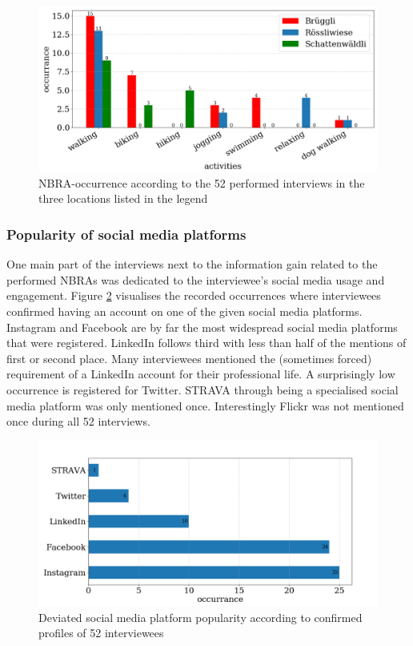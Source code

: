 \begin{figure}[h!]
   \centering
   \includegraphics[width=\textwidth]{img/interview_activities.pdf}
   \caption{NBRA-occurrence according to the 52 performed interviews in the three locations listed in the legend}
   \label{fig:interview_activities}
\end{figure}

\subsubsection{Popularity of social media platforms }
One main part of the interviews next to the information gain related to the performed NBRAs was dedicated to the interviewee's social media usage and engagement. Figure \ref{fig:interview_SMP} visualises the recorded occurrences where interviewees confirmed having an account on one of the given social media platforms. Instagram and Facebook are by far the most widespread social media platforms that were registered. LinkedIn follows third with less than half of the mentions of first or second place. Many interviewees mentioned the (sometimes forced) requirement of a LinkedIn account for their professional life. A surprisingly low occurrence is registered for Twitter. STRAVA through being a specialised social media platform was only mentioned once. Interestingly Flickr was not mentioned once during all 52 interviews.

\begin{figure}[h!]
   \centering
   \includegraphics[width=\textwidth]{img/interview_socialmedia_bigger_font.pdf}
   \caption{Deviated social media platform popularity according to confirmed profiles of 52 interviewees}
   \label{fig:interview_SMP}
\end{figure}

